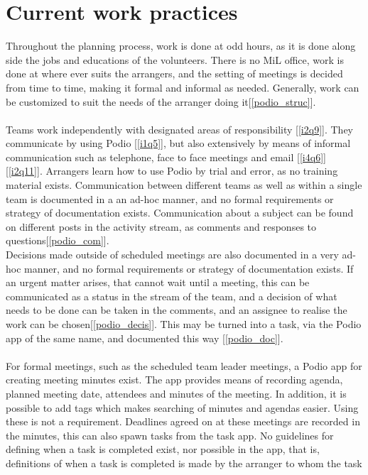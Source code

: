 \section{Current work practices}
Throughout the planning process, work is done at odd hours, as it is done along
side the jobs and educations of the volunteers. There is no MiL office, work is done at where ever suits the arrangers, and the setting of meetings is decided from time to time, making it formal and informal as needed. Generally, work can be customized to suit the needs of the arranger doing it[\ref{podio_struc}].
\\ \\
Teams work independently with designated areas of responsibility [\ref{i2q9}]. They communicate by using Podio [\ref{i1q5}], but also extensively by means of informal communication such as telephone, face to face meetings and email [\ref{i4q6}] [\ref{i2q11}]. Arrangers learn how to use Podio by trial and error, as no training material exists. Communication between different teams as well as within a single team is documented in a an ad-hoc manner, and no formal requirements or strategy of documentation exists. Communication about a subject can be found on different posts in the activity stream, as comments and responses to questions[\ref{podio_com}]. 
\\
Decisions made outside of scheduled meetings are also documented in a very ad-hoc manner, and no formal requirements or strategy of documentation exists. If an urgent matter arises, that cannot wait until a meeting, this can be communicated as a status in the stream of the team, and a decision of what needs to be done can be taken in the comments, and an assignee to realise the work can be chosen[\ref{podio_decis}]. This may be turned into a task, via the Podio app of the same name, and documented this way [\ref{podio_doc}].
\\ \\
For formal meetings, such as the scheduled team leader meetings, a Podio app for
creating meeting minutes exist. The app provides means of recording agenda,
planned meeting date, attendees and minutes of the meeting. In addition, it is
possible to add tags which makes searching of minutes and agendas easier. Using
these is not a requirement. Deadlines agreed on at these meetings are recorded
in the minutes, this can also spawn tasks from the task app. No guidelines for
defining when a task is completed exist, nor possible in the app, that is,
definitions of when a task is completed is made by the arranger to whom the task
